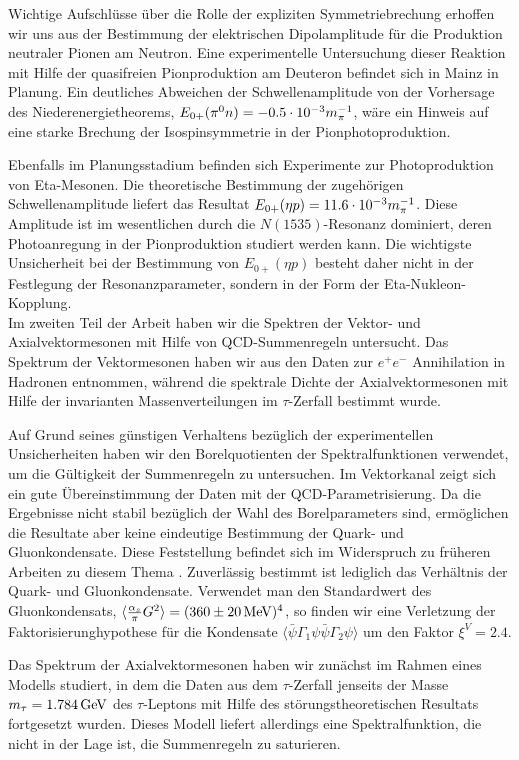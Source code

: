 Wichtige Aufschl\"usse \"uber die Rolle der expliziten Symmetriebrechung 
erhoffen wir uns aus der Bestimmung der elektrischen Dipolamplitude
f\"ur die Produktion neutraler Pi\-onen am Neutron. Eine experimentelle
Untersuchung dieser Reaktion mit Hilfe der quasifreien Pionproduktion
am Deuteron befindet sich in Mainz in Planung. Ein deutliches
Abweichen der Schwellenamplitude von der Vorhersage des 
Niederenergietheorems, $E_{0+}(\pi^0 n) =-0.5\cdot 10^{-3} m_\pi^{-1}$, w\"are ein Hinweis auf eine
starke Brechung der Isospinsymmetrie in der Pionphotoproduktion.

Ebenfalls im Planungsstadium befinden sich Experimente zur Photoproduktion
von Eta-Mesonen. Die theoretische Bestimmung der zugeh\"origen 
Schwellenamplitude liefert das Resultat $E_{0+}(\eta p)=11.6\cdot 10^{-3} m_\pi^{-1}$.
Diese Amplitude ist im wesentlichen durch die $N(1535)$-Resonanz 
dominiert, deren Photoanregung in der Pionproduktion studiert werden 
kann.  Die wichtigste Unsicherheit bei der Bestimmung von $E_{0+}
(\eta p)$ besteht daher nicht in der Festlegung der Resonanzparameter,
sondern in der Form der Eta-Nukleon-Kopplung.
\\

Im zweiten Teil der Arbeit haben wir die Spektren der Vektor- und 
Axialvektormesonen mit Hilfe von QCD-Summenregeln untersucht. Das
Spektrum der Vektormesonen  haben wir aus den Daten zur $e^+e^-$
Annihilation in Hadronen entnommen, w\"ahrend die spektrale Dichte
der Axialvektormesonen mit Hilfe der invarianten Massenverteilungen
im $\tau$-Zerfall bestimmt wurde.

Auf Grund seines g\"unstigen Verhaltens bez\"uglich der experimentellen
Unsicherheiten haben wir den Borelquotienten der Spektralfunktionen 
verwendet, um die G\"ultigkeit der Summenregeln zu untersuchen.
Im Vektorkanal zeigt sich ein gute \"Ubereinstimmung der Daten mit der
QCD-Parametrisierung. Da die Ergebnisse nicht stabil bez\"uglich der
Wahl des Borelparameters sind, erm\"oglichen die Resultate aber keine
eindeutige Bestimmung der Quark- und Gluonkondensate. Diese 
Feststellung befindet sich im Widerspruch zu fr\"uheren Arbeiten zu
diesem Thema \cite{LNT84}. Zuverl\"assig bestimmt ist lediglich das 
Verh\"altnis der Quark- und Gluonkondensate. Verwendet man den
Standardwert des Gluonkondensats, $\langle\frac{\alpha_s}{\pi}G^2
\rangle =(360\pm 20\,\rm MeV)^4$, so finden wir eine Verletzung der
Faktorisierunghypothese f\"ur die Kondensate $\langle\bar\psi
\Gamma_1\psi\bar\psi\Gamma_2\psi\rangle$ um den Faktor $\xi^V =2.4$. 

Das Spektrum der Axialvektormesonen haben wir zun\"achst im Rahmen 
eines Modells studiert, in dem die Daten aus dem $\tau$-Zerfall 
jenseits der Masse $m_\tau =1.784\,\rm GeV$ des $\tau$-Leptons mit 
Hilfe des st\"orungstheoretischen Resultats fortgesetzt wurden.
Dieses Modell liefert allerdings eine Spektralfunktion, die nicht
in der Lage ist, die Summenregeln  zu saturieren. 

